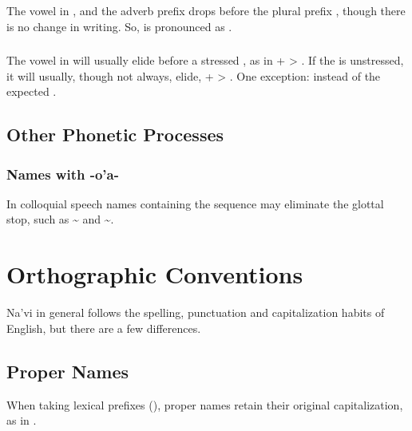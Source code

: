 \subsubsection{} The vowel  in ,  and the adverb
prefix  drops before the plural prefix , though there is
no change in writing.  So,   is pronounced as
. \label{l-and-s:elision-i}

\subsubsection{} The vowel in  will usually elide before a
stressed , as in  +  > . If the 
is unstressed, it will usually, though not always, elide,  +
 > . One exception:  instead of the
expected .

\subsection{Other Phonetic Processes}

\subsubsection{Names with -o'a-} \label{names-with-oa}
In colloquial speech names containing the sequence  may
eliminate the glottal stop, such
as  \textasciitilde{}  
and  \textasciitilde {}.


\section{Orthographic Conventions}
\noindent Na'vi in general follows the spelling, punctuation and
capitalization habits of English, but there are a few differences.

\subsection{Proper Names} When taking lexical prefixes
(), proper names retain their original
capitalization, as in .

